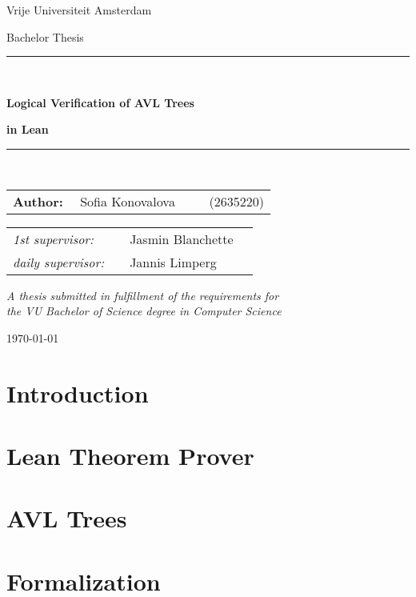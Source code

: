 \documentclass[11pt, oneside, a4paper]{book}
\theoremstyle{definition}
\begin{document}
\thispagestyle{empty}

\begin{center}

Vrije Universiteit Amsterdam

\vspace{1mm}


\vspace{1.5cm}

{\Large Bachelor Thesis}

\vspace*{1.5cm}

\rule{.9\linewidth}{.6pt}\\[0.4cm]
{\huge \bfseries Logical Verification of AVL Trees\par}
{\huge \bfseries in Lean\par}\vspace{0.4cm}
\rule{.9\linewidth}{.6pt}\\[1.5cm]

\vspace*{2mm}

{\Large
\begin{tabular}{l}
{\bf Author:} ~~Sofia Konovalova ~~~~ (2635220)
\end{tabular}
}

\vspace*{1.5cm}

\begin{tabular}{ll}
{\it 1st supervisor:}   & ~~Jasmin Blanchette \\
{\it daily supervisor:} & ~~Jannis Limperg ~~~~ \\
\end{tabular}

\vspace*{2cm}

\textit{A thesis submitted in fulfillment of the requirements for\\ the VU Bachelor of Science degree in Computer Science }

\vspace*{1cm}

\today\\[4cm] %

\end{center}

\tableofcontents

\chapter{Introduction}

\chapter{Lean Theorem Prover}

\chapter{AVL Trees}


\chapter{Formalization}





\appendix
\noappendicestocpagenum
\addappheadtotoc

\end{document}

